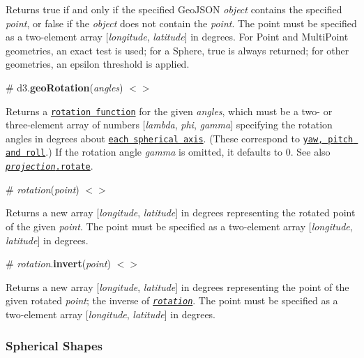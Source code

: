 Returns true if and only if the specified Geo\+J\+S\+ON {\itshape object} contains the specified {\itshape point}, or false if the {\itshape object} does not contain the {\itshape point}. The point must be specified as a two-\/element array \mbox{[}{\itshape longitude}, {\itshape latitude}\mbox{]} in degrees. For Point and Multi\+Point geometries, an exact test is used; for a Sphere, true is always returned; for other geometries, an epsilon threshold is applied.

\label{_geoRotation}%
\# d3.{\bfseries geo\+Rotation}({\itshape angles}) \href{https://github.com/d3/d3-geo/blob/master/src/rotation.js}{\tt $<$$>$}

Returns a \href{#_rotation}{\tt rotation function} for the given {\itshape angles}, which must be a two-\/ or three-\/element array of numbers \mbox{[}{\itshape lambda}, {\itshape phi}, {\itshape gamma}\mbox{]} specifying the rotation angles in degrees about \href{https://bl.ocks.org/mbostock/4282586}{\tt each spherical axis}. (These correspond to \href{http://en.wikipedia.org/wiki/Aircraft_principal_axes}{\tt yaw, pitch and roll}.) If the rotation angle {\itshape gamma} is omitted, it defaults to 0. See also \href{#projection_rotate}{\tt {\itshape projection}.rotate}.

\label{__rotation}%
\# {\itshape rotation}({\itshape point}) \href{https://github.com/d3/d3-geo/blob/master/src/rotation.js#L35}{\tt $<$$>$}

Returns a new array \mbox{[}{\itshape longitude}, {\itshape latitude}\mbox{]} in degrees representing the rotated point of the given {\itshape point}. The point must be specified as a two-\/element array \mbox{[}{\itshape longitude}, {\itshape latitude}\mbox{]} in degrees.

\label{_rotation_invert}%
\# {\itshape rotation}.{\bfseries invert}({\itshape point}) \href{https://github.com/d3/d3-geo/blob/master/src/rotation.js#L47}{\tt $<$$>$}

Returns a new array \mbox{[}{\itshape longitude}, {\itshape latitude}\mbox{]} in degrees representing the point of the given rotated {\itshape point}; the inverse of \href{#_rotation}{\tt {\itshape rotation}}. The point must be specified as a two-\/element array \mbox{[}{\itshape longitude}, {\itshape latitude}\mbox{]} in degrees.

\subsubsection*{Spherical Shapes}

